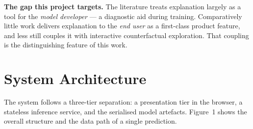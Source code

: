 \documentclass[11pt,a4paper]{article}
\begin{document}
\textbf{The gap this project targets.} The literature treats explanation
largely as a tool for the \emph{model developer} --- a diagnostic aid during
training. Comparatively little work delivers explanation to the \emph{end user}
as a first-class product feature, and less still couples it with interactive
counterfactual exploration. That coupling is the distinguishing feature of this
work.

\section{System Architecture}

The system follows a three-tier separation: a presentation tier in the browser,
a stateless inference service, and the serialised model artefacts. Figure~1
shows the overall structure and the data path of a single prediction.
\end{document}
